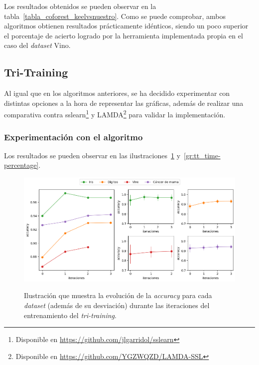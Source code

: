 Los resultados obtenidos se pueden observar en la tabla~\ref{tabla_coforest_keelvsnuestro}. Como se puede comprobar, ambos algoritmos obtienen resultados prácticamente idénticos, siendo un poco superior el porcentaje de acierto logrado por la herramienta implementada propia en el caso del \textit{dataset} Vino.


\subsection{Tri-Training}
\label{tritraining-exp}

Al igual que en los algoritmos anteriores, se ha decidido experimentar con distintas opciones a la hora de representar las gráficas, además de realizar una comparativa contra sslearn\footnote{ Disponible en {\url{https://github.com/jlgarridol/sslearn}}} y LAMDA\footnote{Disponible en {\url{https://github.com/YGZWQZD/LAMDA-SSL}}} para validar la implementación.


\subsubsection{Experimentación con el algoritmo}

Los resultados se pueden observar en las ilustraciones~\ref{gr:tt_train-iterations} y~\ref{gr:tt_time-percentage}.

\begin{figure}[h]
	\caption[\textit{Tri-training}: resultados (iteraciones-entrenamiento)]{Ilustración que muestra la evolución de la \textit{accuracy} para cada \textit{dataset} (además de su desviación) durante las iteraciones del entrenamiento del \textit{tri-training}.}
	\centering
	\includegraphics[width=\textwidth]{../img/memoria/5_tritraining_score-iteraciones}
	\label{gr:tt_train-iterations}
\end{figure}

